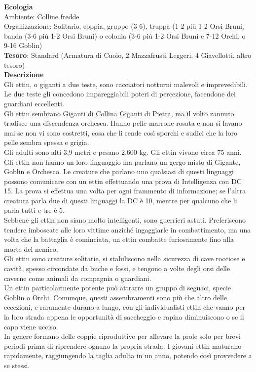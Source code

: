 \begin{multicols}{2}
	\textbf{Ecologia}\\
	Ambiente: Colline fredde\\
	Organizzazione: Solitario, coppia, gruppo (3-6), truppa (1-2 più 1-2 Orsi Bruni, banda (3-6 più 1-2 Orsi Bruni) o colonia (3-6 più 1-2 Orsi Bruni e 7-12 Orchi, o 9-16 Goblin)\\
	\textbf{Tesoro}: Standard (Armatura di Cuoio, 2 Mazzafrusti Leggeri, 4 Giavellotti, altro tesoro)\\
	\textbf{Descrizione}\\
	Gli ettin, o giganti a due teste, sono cacciatori notturni malevoli e imprevedibili. Le due teste gli concedono impareggiabili poteri di percezione, facendone dei guardiani eccellenti.\\
	Gli ettin sembrano Giganti di Collina Giganti di Pietra, ma il volto zannuto tradisce una discendenza orchesca. Hanno pelle marrone rosata e non si lavano mai se non vi sono costretti, cosa che li rende così sporchi e sudici che la loro pelle sembra spessa e grigia.\\
	Gli adulti sono alti 3,9 metri e pesano 2.600 kg. Gli ettin vivono circa 75 anni.\\
	Gli ettin non hanno un loro linguaggio ma parlano un gergo misto di Gigante, Goblin e Orchesco. Le creature che parlano uno qualsiasi di questi linguaggi possono comunicare con un ettin effettuando una prova di Intelligenza con DC 15. La prova si effettua una volta per ogni frammento di informazione; se l'altra creatura parla due di questi linguaggi la DC è 10, mentre per qualcuno che li parla tutti e tre è 5.\\
	Sebbene gli ettin non siano molto intelligenti, sono guerrieri astuti. Preferiscono tendere imboscate alle loro vittime anziché ingaggiarle in combattimento, ma una volta che la battaglia è cominciata, un ettin combatte furiosamente fino alla morte del nemico.\\
	Gli ettin sono creature solitarie, si stabiliscono nella sicurezza di cave rocciose e cavità, spesso circondate da buche e fossi, e tengono a volte degli orsi delle caverne come animali da compagnia o guardiani.\\
	Un ettin particolarmente potente può attrarre un gruppo di seguaci, specie Goblin o Orchi. Comunque, questi assembramenti sono più che altro delle eccezioni, e raramente durano a lungo, con gli individualisti ettin che vanno per la loro strada appena le opportunità di saccheggio e rapina diminuiscono o se il capo viene ucciso.\\
	In genere formano delle coppie riproduttive per allevare la prole solo per brevi periodi prima di riprendere ognuno la propria strada. I giovani ettin maturano rapidamente, raggiungendo la taglia adulta in un anno, potendo così provvedere a se stessi.


\end{multicols}
